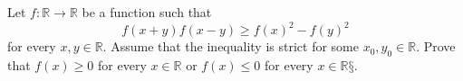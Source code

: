 Let $f\colon \mathbb{R} \rightarrow \mathbb{R}$ be a function such that 
$$f(x+y)f(x-y) \ge f(x)^2 - f(y)^2$$
for every $x,y\in\mathbb{R}$.
Assume that the inequality is strict for some $x_0,y_0 \in \mathbb{R}$.
Prove that $f(x)\ge 0$ for every $x\in\mathbb{R}$ or $f(x)\le 0$ for every $x\in\mathbb{R}§$.
